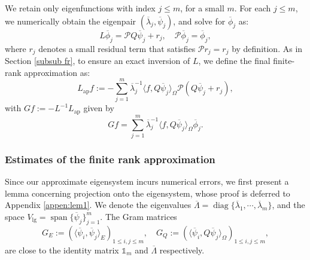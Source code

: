 \documentclass[11pt,a4paper]{article}
\numberwithin{equation}{section}
\newcommand{\assign}{:=}
\newcommand{\tmop}[1]{\ensuremath{\operatorname{#1}}}
\begin{document}
We retain only eigenfunctions with index $j \leqslant m$, for a small $m$.
For each $j 
\leqslant m$, we numerically obtain the eigenpair $(\overline{\lambda}_j,\overline{\psi}_j)$, and solve for $\overline{\phi}_j$ as:
\begin{equation}
  L \overline{\phi}_j= \mathcal{P} Q \overline\psi_j + r_j, \quad \mathcal{P} \overline\phi_j =\overline\phi_j, \label{eq:phi
  eq}
\end{equation}
where $r_j$ denotes a small residual term that satisfies $\mathcal{P} r_j =r_j$ by definition. As in Section \ref{subsub fr}, to ensure an exact inversion of $L$, we define the final finite-rank approximation as:
\begin{equation}
  L_{\tmop{ap}} f \assign -\sum_{j = 1}^m\overline{\lambda}_j^{-1} \langle f, Q\overline\psi_j \rangle_{
  \Omega} \mathcal{P} (Q \overline\psi_j + r_j) , \label{eq:Lap def}
\end{equation}
with $Gf\assign-L^{-1}L_{\tmop{ap}}$ given by\[Gf= \sum_{j = 1}^m\overline{\lambda}_j^{-1} \langle f, Q\overline\psi_j \rangle_{
  \Omega} \overline\phi_j.\]

\subsubsection{Estimates of the finite rank approximation}\label{Estimate_finite_rank}
Since our approximate eigensystem incurs numerical errors, we first present a lemma concerning projection onto the eigensystem, whose proof is deferred to Appendix \ref{appen:lem1}. We denote the eigenvalues $\overline\Lambda=\tmop{diag}\{\overline\lambda_1,\cdots,\overline\lambda_m\}$, and the space $V_{\tmop{lg}}=\tmop{span}\{\overline\psi_j\}_{j=1}^m$.   The Gram matrices \begin{equation*}
G_E\assign(\langle \overline\psi_i, \overline\psi_j \rangle_{E})_{1\leqslant i, j\leqslant m},\quad  G_Q\assign(\langle \overline\psi_i, Q\overline\psi_j \rangle_{ \Omega})_{1\leqslant i, j\leqslant m},
      \label{eq:qusi-or}
  \end{equation*} are close to the identity matrix $\mathbb{1}_{m}$ and $\overline\Lambda$ respectively. %
\end{document}
